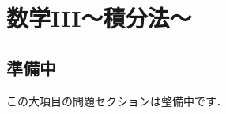 \documentclass[../../ms_q.tex]{subfiles}
\begin{document}
\section{数学III～積分法～}

\subsection*{準備中}
この大項目の問題セクションは整備中です．
\end{document}
